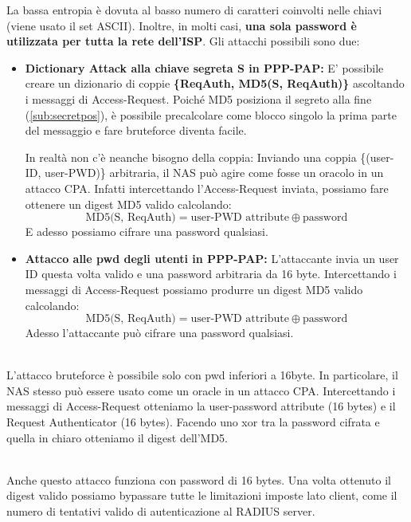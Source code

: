 \begin{proposition}
La bassa entropia è dovuta al basso numero di caratteri coinvolti nelle chiavi (viene usato il set ASCII). Inoltre, in molti casi, \textbf{una sola password è utilizzata per tutta la rete dell'ISP}. Gli attacchi possibili sono due:
\begin{itemize}
    \item \textbf{Dictionary Attack alla chiave segreta S in PPP-PAP:} E' possibile creare un dizionario di coppie \textbf{\{ReqAuth, MD5(S, ReqAuth)\}} ascoltando i messaggi di Access-Request. Poiché MD5 posiziona il segreto alla fine (\cref{sub:secretpos}), è possibile precalcolare come blocco singolo la prima parte del messaggio e fare bruteforce diventa facile.\\
    \begin{remark}
    In realtà non c'è neanche bisogno della coppia: Inviando una coppia \{(user-ID, user-PWD)\} arbitraria, il NAS può agire come fosse un oracolo in un attacco CPA. Infatti intercettando l'Access-Request inviata, possiamo fare ottenere un digest MD5 valido calcolando:
    \[\text{MD5(S, ReqAuth)}=\text{user-PWD attribute}\oplus\text{password}\]
    E adesso possiamo cifrare una password qualsiasi.
    \end{remark}
    \item \textbf{Attacco alle pwd degli utenti in PPP-PAP:} L'attaccante invia un user ID questa volta valido e una password arbitraria da 16 byte. Intercettando i messaggi di Access-Request possiamo produrre un digest MD5 valido calcolando:
    \[\text{MD5(S, ReqAuth)}=\text{user-PWD attribute}\oplus\text{password}\]
    Adesso l'attaccante può cifrare una password qualsiasi.
\end{itemize}
\end{proposition}
\begin{note}\\
L'attacco bruteforce è possibile solo con pwd inferiori a 16byte. In particolare, il NAS stesso può essere usato come un oracle in un attacco CPA. Intercettando i messaggi di Access-Request otteniamo la user-password attribute (16 bytes) e il Request Authenticator (16 bytes). Facendo uno xor tra la password cifrata e quella in chiaro otteniamo il digest dell'MD5.
\end{note}
\begin{note}\\
Anche questo attacco funziona con password di 16 bytes. Una volta ottenuto il digest valido possiamo bypassare tutte le limitazioni imposte lato client, come il numero di tentativi valido di autenticazione al RADIUS server.
\end{note}
